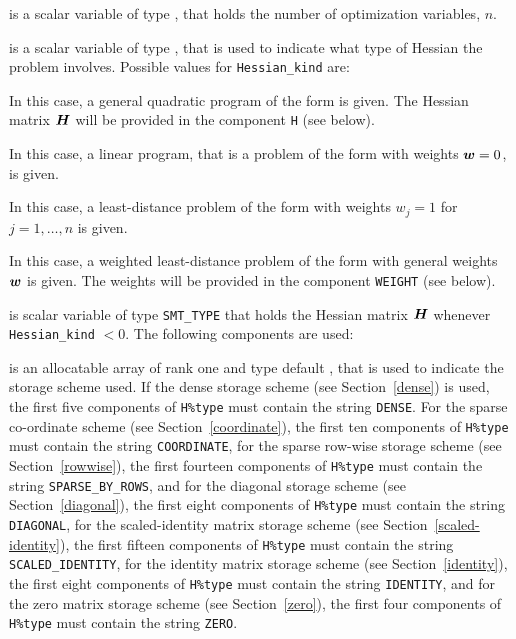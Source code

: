 \documentclass{galahad}
\begin{document}
\begin{description}

 is a scalar variable of type \integer,
 that holds the number of optimization variables, $n$.

 is a scalar variable of type \integer,
that is used to indicate what type of Hessian the problem involves.
Possible values for {\tt Hessian\_kind} are:

\begin{description}
  In this case, a general quadratic program of the form
 is given. The Hessian matrix ${\bm{H}}$ will be provided in the
component {\tt H} (see below).

  In this case, a linear program, that is a problem of the form
 with weights ${\bm{w}} = 0$, is given.

 In this case, a least-distance problem of the form 
with weights $w_{j} = 1$ for $j = 1, \ldots , n$ is given.

 In this case, a weighted least-distance problem of the form 
with general weights ${\bm{w}}$ is given. The weights will be
provided in the component {\tt WEIGHT} (see below).
\end{description}

 is scalar variable of type {\tt SMT\_TYPE}
that holds the Hessian matrix ${\bm{H}}$ whenever {\tt Hessian\_kind} $<0$.
The following components are used:

\begin{description}

 is an allocatable array of rank one and type default \character,
that is used to indicate the storage scheme used. If the dense storage scheme
(see Section~\ref{dense}) is used,
the first five components of {\tt H\%type} must contain the
string {\tt DENSE}.
For the sparse co-ordinate scheme (see Section~\ref{coordinate}),
the first ten components of {\tt H\%type} must contain the
string {\tt COORDINATE},
for the sparse row-wise storage scheme (see Section~\ref{rowwise}),
the first fourteen components of {\tt H\%type} must contain the
string {\tt SPARSE\_BY\_ROWS},
and for the diagonal storage scheme (see Section~\ref{diagonal}),
the first eight components of {\tt H\%type} must contain the
string {\tt DIAGONAL},
for the scaled-identity matrix storage scheme
(see Section~\ref{scaled-identity}),
the first fifteen components of {\tt H\%type} must contain the
string {\tt SCALED\_IDENTITY},
for the identity matrix storage scheme
(see Section~\ref{identity}),
the first eight components of {\tt H\%type} must contain the
string {\tt IDENTITY}, and
for the zero matrix storage scheme
(see Section~\ref{zero}),
the first four components of {\tt H\%type} must contain the
string {\tt ZERO}.


\end{description}
\end{description}
\end{document}
